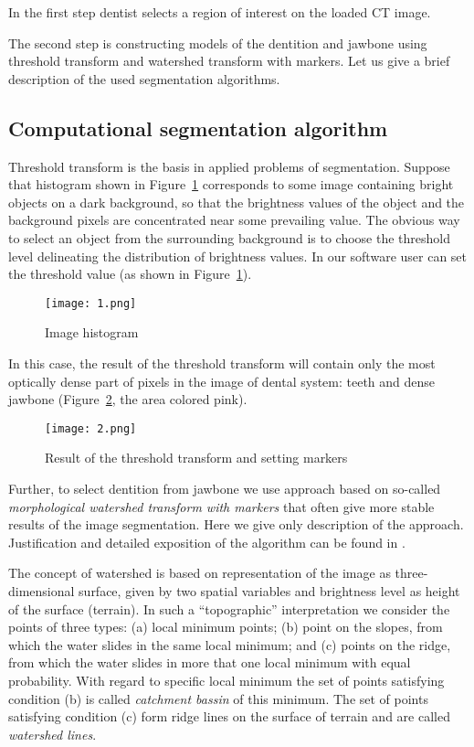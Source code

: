 \documentclass{elsarticle}
\begin{document}
In the first step dentist selects a region of interest on the
loaded CT image.

The second step is constructing models of the dentition and jawbone
using threshold transform and watershed transform with markers. Let us
give a brief description of the used segmentation algorithms.

\subsection{Computational segmentation algorithm} 
Threshold transform is the basis in applied problems of
segmentation. Suppose that histogram shown in Figure~\ref{fig:1}
corresponds to some image  containing bright objects on a
dark background, so that the brightness values of the object and the
background pixels are concentrated near some prevailing value. The
obvious way to select an object from the surrounding background is to
choose the threshold level delineating the distribution of brightness
values. In our software user can set the threshold value  (as shown
in Figure~\ref{fig:1}). 
\begin{figure}[h]
  \centering
  \texttt{[image: 1.png]}
  \caption{Image histogram}
  \label{fig:1}
\end{figure}

In this case, the result of the threshold transform will contain only
the most optically dense part of pixels in the image of dental system:
teeth and dense jawbone (Figure~\ref{fig:2}, the area colored pink).
\begin{figure}[h]
  \centering
  \texttt{[image: 2.png]}
  \caption{Result of the threshold transform and setting markers}
  \label{fig:2}
\end{figure}

Further, to select dentition from jawbone we use approach based on
so-called \emph{morphological watershed transform with markers} that
often give more stable results of the image segmentation. Here we give
only description of the approach. Justification and detailed
exposition of the algorithm can be found in
\cite{GonsWoods,BeareLehmann2006}.

The concept of watershed is based on representation of the image as
three-dimensional surface, given by two spatial variables and
brightness level as height of the surface (terrain). In such a
``topographic'' interpretation we consider the points of three types:
(a) local minimum points; (b) point on the slopes, from which the
water slides in the same local minimum; and (c) points on the ridge,
from which the water slides in more that one local minimum with equal
probability. With regard to specific local minimum the set of points
satisfying condition (b) is called \emph{catchment bassin} of this
minimum. The set of points satisfying condition (c) form ridge lines
on the surface of terrain and are called \emph{watershed lines}.
\end{document}
